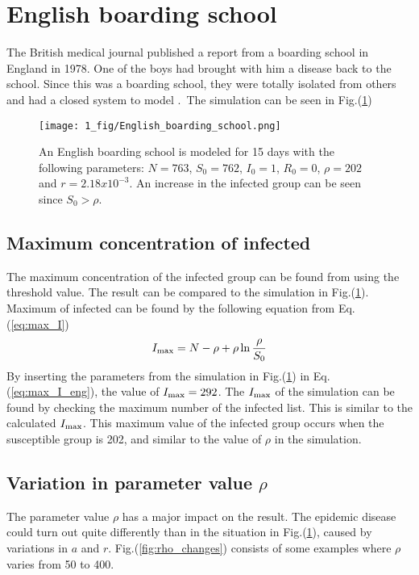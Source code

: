 \documentclass[%
twoside,                 %
final,                   %
chapterprefix=true,      %
open=right               %
10pt]{book}
\begin{document}
\section{English boarding school}
\label{section:1_english}
The British medical journal published a report from a boarding school in England in 1978. One of the boys had brought with him a disease back to the school. Since this was a boarding school, they were totally isolated from others and had a closed system to model \cite[p.~325]{murray2002mathematical}.~The simulation can be seen in Fig.(\ref{fig:english_boarding})  


\begin{figure}[ht]
  \centerline{\texttt{[image: 1\_fig/English\_boarding\_school.png]}}
  \caption{
  \label{fig:english_boarding} An English boarding school is modeled for 15 days with the following parameters: $N=763$, $S_0=762$, $I_0=1$, $R_0=0$, $\rho=202$ and $r=2.18 x 10^{-3}$. An increase in the infected group can be seen since $S_0 > \rho$.
  }
\end{figure}


\subsection{Maximum concentration of infected}
The maximum concentration of the infected group can be found from using the threshold value. The result can be compared to the simulation in Fig.(\ref{fig:english_boarding}). Maximum of infected can be found by the following equation from Eq.(\ref{eq:max_I})
\begin{equation} \label{eq:max_I_eng}
I_{\textrm{max}}= N - \rho + \rho \ln\frac{\rho}{S_0} 
\end{equation}
By inserting the parameters from the simulation in Fig.(\ref{fig:english_boarding}) in Eq.(\ref{eq:max_I_eng}), the value of $I_{\textrm{max}} = 292$. The $I_{\textrm{max}}$ of the simulation can be found by checking the maximum number of the infected list. This is similar to the calculated $I_{\textrm{max}}$. This maximum value of the infected group occurs when the susceptible group is 202, and similar to the value of $\rho$ in the simulation.

\subsection{Variation in parameter value $\rho$}
The parameter value $\rho$ has a major impact on the result. The epidemic disease could turn out quite differently than in the situation in Fig.(\ref{fig:english_boarding}), caused by variations in $a$ and $r$. Fig.(\ref{fig:rho_changes}) consists of some examples where $\rho$ varies from 50 to 400.
\end{document}
